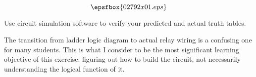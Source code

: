 

$$\epsfbox{02792x01.eps}$$

\vfil \eject






Use circuit simulation software to verify your predicted and actual truth tables.







The transition from ladder logic diagram to actual relay wiring is a confusing one for many students.  This is what I consider to be the most significant learning objective of this exercise: figuring out how to build the circuit, not necessarily understanding the logical function of it.




